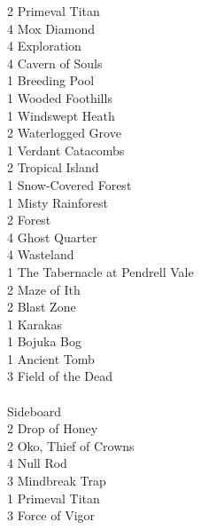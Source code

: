 \documentclass{report}
\begin{document}
2 Primeval Titan\\
4 Mox Diamond\\
4 Exploration\\
4 Cavern of Souls\\
1 Breeding Pool\\
1 Wooded Foothills\\
1 Windswept Heath\\
2 Waterlogged Grove\\
1 Verdant Catacombs\\
2 Tropical Island\\
1 Snow-Covered Forest\\
1 Misty Rainforest\\
2 Forest\\
4 Ghost Quarter\\
4 Wasteland\\
1 The Tabernacle at Pendrell Vale\\
2 Maze of Ith\\
2 Blast Zone\\
1 Karakas\\
1 Bojuka Bog\\
1 Ancient Tomb\\
3 Field of the Dead\\\\
Sideboard\\
2 Drop of Honey\\
2 Oko, Thief of Crowns\\
4 Null Rod\\
3 Mindbreak Trap\\
1 Primeval Titan\\
3 Force of Vigor\\\\\\
\end{document}
